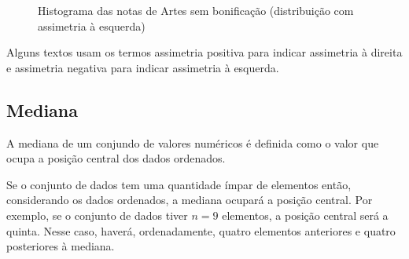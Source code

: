 \begin{figure}[H]
\centering
\capstart

\caption{Histograma das notas de Artes sem bonificação (distribuição com assimetria à esquerda)}

\label{\detokenize{PE104-1:fig-assimetriaaesquerda}}\label{\detokenize{PE104-1:id15}}\end{figure}

Alguns textos usam os termos assimetria positiva para indicar assimetria à direita e assimetria negativa para indicar assimetria à esquerda.

\subsection{Mediana}

A mediana de um conjundo de valores numéricos é definida como o valor que ocupa a posição central dos dados ordenados.

Se o conjunto de dados tem uma quantidade ímpar de elementos então, considerando os dados ordenados, a mediana ocupará a posição central. Por exemplo, se o conjunto de dados tiver \(n=9\) elementos, a posição central será a quinta. Nesse caso, haverá, ordenadamente, quatro elementos anteriores e quatro posteriores à mediana.



